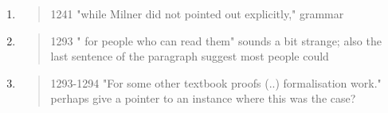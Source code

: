 \begin{enumerate}
  \item \begin{quote}
1241 "while Milner did not pointed out explicitly," grammar
\end{quote}
  \Mark

  \item \begin{quote}
1293 " for people who can read them" sounds a bit strange; also the last sentence of the paragraph suggest most people could
\end{quote}
  \Mark

  \item \begin{quote}
1293-1294 "For some other textbook proofs (..) formalisation work." perhaps give a pointer to an instance where this was the case?
\end{quote}
  \Mark

\end{enumerate}
